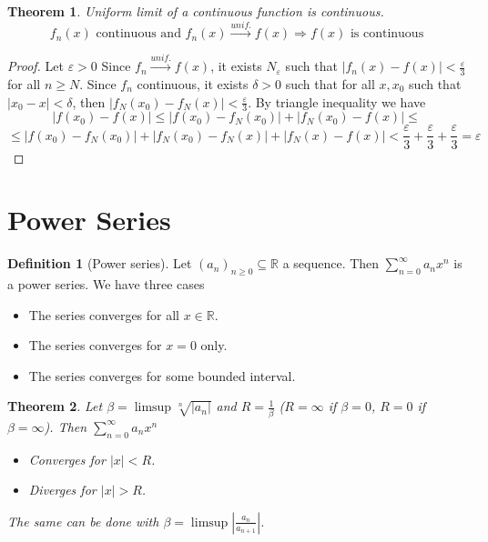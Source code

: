 \documentclass{article}
\newcommand{\DS}{\displaystyle}
\newcommand{\abs}[1]{\left|#1\right|}
\newcommand{\Ar}{\Rightarrow}
\newcommand{\tounif}{\xrightarrow{unif.}}
\theoremstyle{definition}
\newtheorem{definition}{Definition}[section]
\theoremstyle{definition}
\theoremstyle{plain}
\newtheorem{theorem}{Theorem}[section]
\theoremstyle{plain}
\theoremstyle{plain}
\theoremstyle{plain}
\theoremstyle{definition}
\theoremstyle{remark}
\theoremstyle{remark}
\theoremstyle{remark}
\theoremstyle{remark}
\newcommand{\R}{\mathbb{R}}
\newcommand{\pseries}[1]{\sum_{n=0}^\infty #1}
\newcommand{\E}{\varepsilon}
\begin{document}
\begin{theorem}
  Uniform limit of a continuous function is continuous.
  \[
  f_n(x) \text{ continuous and } f_n(x) \tounif f(x) \Ar f(x) \text{ is continuous}
  \]
\end{theorem}

\begin{proof}
  Let $\E > 0$ Since $f_n \tounif f(x)$, it exists $N_\E$ such that $\abs{f_n(x)-f(x)} <
  \frac{\E}{3}$ for all $n \geq N$. Since $f_n$ continuous, it exists $\delta > 0$ such that for all $x,x_0$ such that $\abs{x_0 - x} < \delta$, then $\abs{f_N(x_0) - f_N(x)} < \frac{\E}{3}$. By triangle inequality we have
  \[
  \abs{f(x_0) - f(x)} \leq
  \abs{f(x_0) - f_N(x_0)} + \abs{f_N(x_0) - f(x)} \leq
  \]
  \[ \leq
  \abs{f(x_0) - f_N(x_0)} + \abs{f_N(x_0) - f_N(x)} + \abs{f_N(x) - f(x)} <
  \frac{\E}{3} + \frac{\E}{3} + \frac{\E}{3} =
  \E
  \]
\end{proof}





\section{Power Series}


\begin{definition}[Power series]
  Let $(a_n)_{n \geq 0} \subseteq \R$ a sequence. Then $\pseries{a_n x^n}$ is a power series. We have three cases
  \begin{itemize}
  \item The series converges for all $x \in \R$.
  \item The series converges for $x = 0$ only.
  \item The series converges for some bounded interval.
  \end{itemize}
\end{definition}


\begin{theorem}
  Let $\beta = \limsup \sqrt[n]{|a_n|}$ and $R = \frac{1}{\beta}$ ($R = \infty$ if $\beta = 0$, $R = 0$ if $\beta = \infty$). Then $\DS \pseries{a_n x^n}$
  \begin{itemize}
  \item Converges for $|x| < R$.
  \item Diverges for $|x| > R$.
  \end{itemize}
  The same can be done with $\beta = \limsup \abs{\frac{a_n}{a_{n+1}}}$.
\end{theorem}
\end{document}
